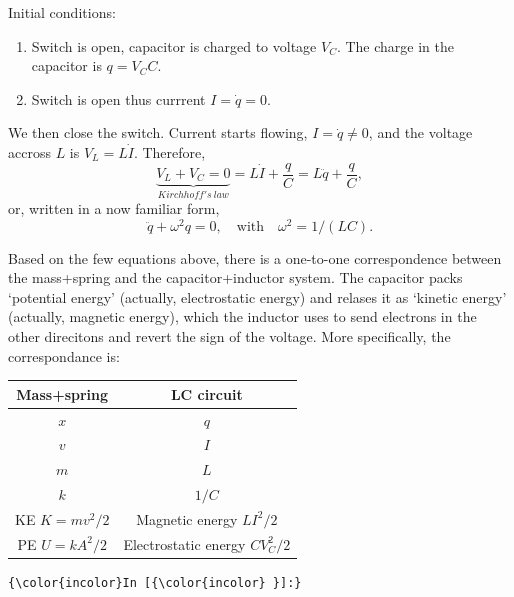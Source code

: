 \documentclass[11pt]{article}
\begin{document}
    Initial conditions:

\begin{enumerate}
\def\labelenumi{\arabic{enumi}.}
\item
  Switch is open, capacitor is charged to voltage \(V_C\). The charge in
  the capacitor is \(q = V_C C\).
\item
  Switch is open thus currrent \(I=\dot{q} = 0\).
\end{enumerate}

    We then close the switch. Current starts flowing, \(I = \dot q \neq 0\),
and the voltage accross \(L\) is \(V_L = L \dot I\). Therefore,
\[ \underbrace{V_L+V_C = 0}_{Kirchhof\!f's\ law} = L\dot I + \frac{q}C  = L\ddot q + \frac{q}C, \]
or, written in a now familiar form,
\[ \boxed{\ddot q + \omega^2 q = 0, \quad \textrm{with}\quad \omega^2 = 1/(LC).} \]

    Based on the few equations above, there is a one-to-one correspondence
between the mass+spring and the capacitor+inductor system. The capacitor
packs `potential energy' (actually, electrostatic energy) and relases it
as `kinetic energy' (actually, magnetic energy), which the inductor uses
to send electrons in the other direcitons and revert the sign of the
voltage. More specifically, the correspondance is:

\begin{longtable}[]{@{}cc@{}}
\toprule
Mass+spring & LC circuit\tabularnewline
\midrule
\endhead
\(x\) & \(q\)\tabularnewline
\(v\) & \(I\)\tabularnewline
\(m\) & \(L\)\tabularnewline
\(k\) & \(1/C\)\tabularnewline
KE \(K = mv^2/2\) & Magnetic energy \(LI^2/2\)\tabularnewline
PE \(U = kA^2/2\) & Electrostatic energy \(CV_C^2/2\)\tabularnewline
\bottomrule
\end{longtable}

    \begin{Verbatim}[commandchars=\\\{\}]
{\color{incolor}In [{\color{incolor} }]:}  
\end{Verbatim}


    
    
    
    
\end{document}
